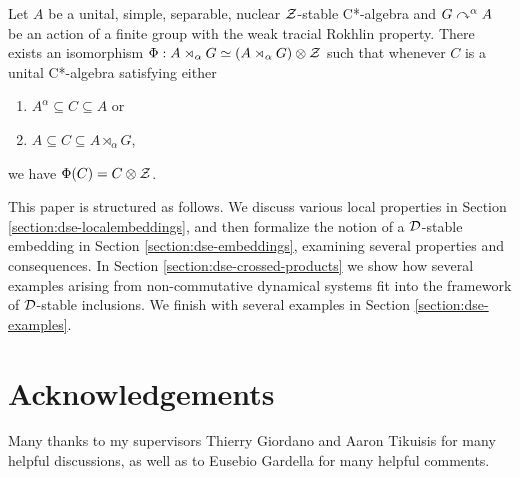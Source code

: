 \documentclass[12pt]{amsart}
\begin{document}
  \begin{resultcor}
            Let $A$ be a unital, simple, separable, nuclear $\mathcal{Z}$-stable C*-algebra and $G \curvearrowright^\alpha A$ be an action of a finite group with the weak tracial Rokhlin property. There exists an isomorphism $\Phi: A \rtimes_\alpha G \simeq (A \rtimes_\alpha G) \otimes \mathcal{Z}$ such that whenever $C$ is a unital C*-algebra satisfying either
              \begin{enumerate}
                \item $A^\alpha \subseteq C \subseteq A$ or
                \item $A \subseteq C \subseteq A \rtimes_\alpha G$,
              \end{enumerate}
              we have $\Phi(C) = C \otimes \mathcal{Z}$. 
          \end{resultcor}

  This paper is structured as follows. We discuss various local properties in Section \ref{section:dse-localembeddings}, and then formalize the notion of a $\mathcal{D}$-stable embedding in Section \ref{section:dse-embeddings}, examining several properties and consequences. In Section \ref{section:dse-crossed-products} we show how several examples arising from non-commutative dynamical systems fit into the framework of $\mathcal{D}$-stable inclusions. We finish with several examples in Section \ref{section:dse-examples}.



  \section*{Acknowledgements}
  Many thanks to my supervisors Thierry Giordano and Aaron Tikuisis for many helpful discussions, as well as to Eusebio Gardella for many helpful comments.  

  
\end{document}
